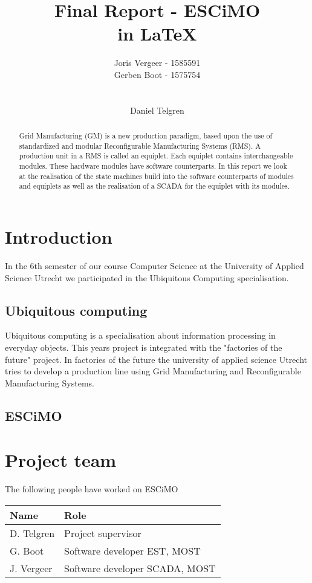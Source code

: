 \documentclass[12pt,a4paper]{report}
\title{
Final Report - ESCiMO \\
in \LaTeX{}
}
\author{
Joris Vergeer - 1585591\\
Gerben Boot - 1575754\\
\\
\\
Daniel Telgren
}
\begin{document}
\maketitle

\begin{abstract}
Grid Manufacturing (GM) is a new production paradigm, based upon the use of standardized and modular Reconfigurable Manufacturing Systems (RMS).\cite{SICE13}
A production unit in a RMS is called an equiplet.
Each equiplet contains interchangeable modules. 
These hardware modules have software counterparts.
In this report we look at the realisation of the state machines build into the software counterparts of modules and equiplets as well as the realisation of a SCADA for the equiplet with its modules.
\end{abstract}

\tableofcontents

\chapter{Introduction}
In the 6th semester of our course Computer Science at the University of Applied Science Utrecht we participated in the Ubiquitous Computing specialisation.

\section{Ubiquitous computing}
Ubiquitous computing is a specialisation about information processing in everyday objects.\cite{wiki_ubicomp}
This years project is integrated with the "factories of the future" project.\cite{ubi_project_note}
In factories of the future the university of applied science Utrecht tries to develop a production line using Grid Manufacturing and Reconfigurable Manufacturing Systems.

\section{ESCiMO}

\chapter{Project team}
The following people have worked on ESCiMO

\begin{tabular}{l | l}
Name       & Role \\
\hline
D. Telgren & Project supervisor \\
G. Boot    & Software developer EST, MOST \\
J. Vergeer & Software developer SCADA, MOST
\end{tabular}
\end{document}
